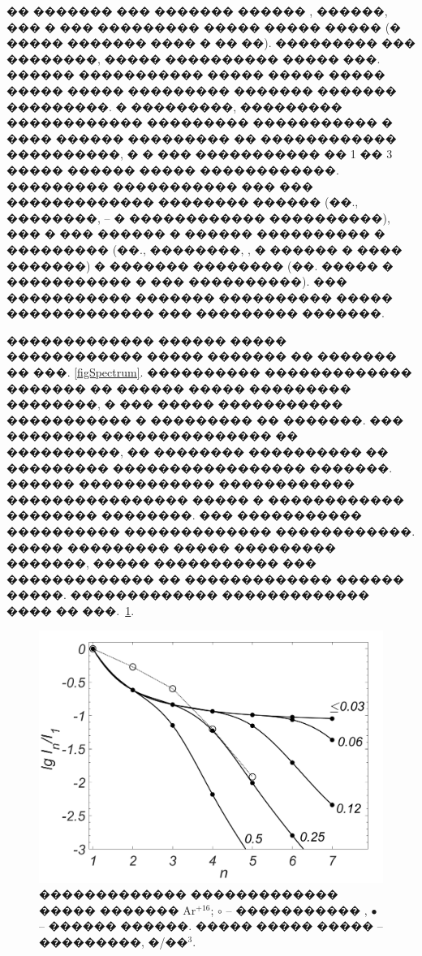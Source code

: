 \documentclass[12pt,titlepage]{article}
\begin{document}
�� ������� ��� ������� ������ \cite{Hooper1988}, \cite{BurrisMog2006} ������, ��� � ��� ��������� ����� ����� ����� (� ����� ������� ���� � �� ��). ��������� ��� ��������, ����� ���������� ����� ���. ������ ����������� ����� ����� ����� ����� ����� ��������� ������� ������� ���������. � ���������, ��������� ������������ ��������� ����������� � ���� ������ ��������� �� ������������ ����������, � � ��� ����������� �� 1 �� 3 ����� ������ ����� ������������. ��������� ����������� ��� ��� ������������� �������� ������ (��., ��������, \cite{Fournier2001} -- \cite{Hakel2014} � ������������ ����������), ��� � ��� ������ � ������ ���������� � ��������� (��., ��������, \cite{Bitter1984}, \cite{Goryaev2003} � ������ � ���� �������) � ������� �������� (��. ����� \cite{Demura2018} � ����������� � ��� ����������). ��� ����������� ������� ���������� ����� ������������� ��� ��������� �������.

������������� ������ ����� ������������ ����� ������� �� ������� �� ���. \ref{figSpectrum}. ���������� ������������� ������� �� ������ ����� ��������� ��������, � ��� ����� ����������� ����������� � ��������� �� �������. ��� �������� ��������������� �� ����������, �� �������� ���������� �� ��������� ����������������� �������. ������ ������������ ������������ ���������������� ����� � ������������ �������� ��������. ��� ����������� ���������� ������������� ������������. ����� ��������� ����� ��������� �������, ����� ����������� ��� ������������� �� ������������� ������ �����. ������������� ������������� ���� �� ���.~\ref{figIntensities}.

\begin{figure}[h!]
\centerline{
\includegraphics[width=0.7\linewidth]{Intensities.png}
}
\caption{������������� ������������� ����� ������� Ar$^{+16}$; $\circ$ -- ����������� \cite{Hooper1988}, $\bullet$ -- ������ ������. ����� ����� ����� -- ���������, �/��$^3$.} \label{figIntensities}
\end{figure}
\end{document}
